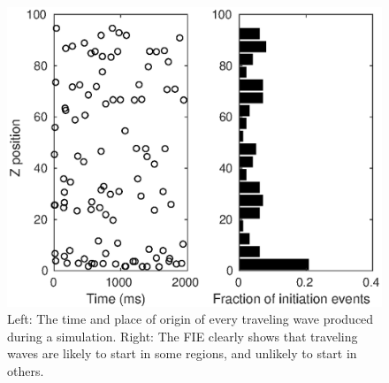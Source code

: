 \documentclass[12pt]{article}
\begin{document}
\begin{figure}[!htb]
 \caption{Left: The time and place of origin of every traveling wave produced during a simulation. Right: The FIE clearly shows that traveling waves are likely to start in some regions, and unlikely to start in others.}
 \label{fig:wave_initiation_sites}
 \centering
   \includegraphics[width=\textwidth]{fig/InitiationSites_100sims}
\end{figure}
\end{document}
